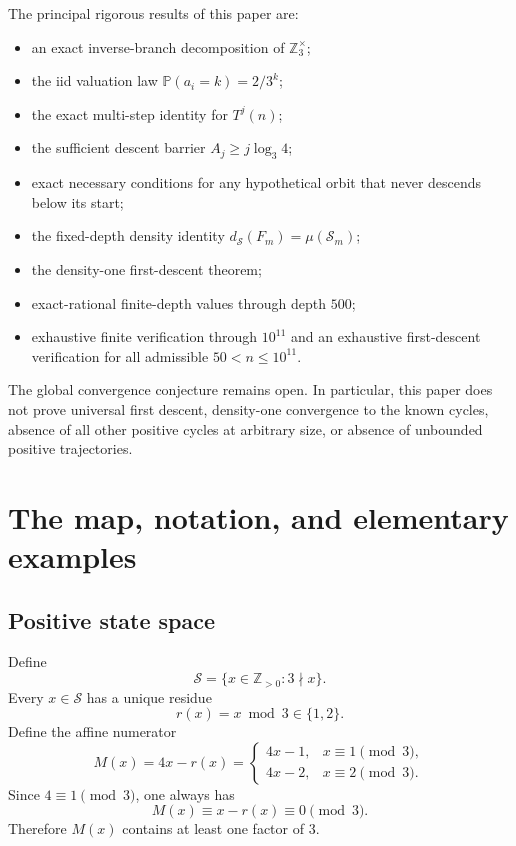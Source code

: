 \documentclass[11pt]{article}
\theoremstyle{definition}
\theoremstyle{remark}
\newcommand{\Sset}{\mathcal S}
\newcommand{\Z}{\mathbb Z}
\newcommand{\Zthree}{\mathbb Z_3}
\newcommand{\Prob}{\mathbb P}
\newcommand{\ds}{d_{\Sset}}
\begin{document}
The principal rigorous results of this paper are:
\begin{itemize}[leftmargin=2.2em]
\item an exact inverse-branch decomposition of $\Zthree^\times$;
\item the iid valuation law $\Prob(a_i=k)=2/3^k$;
\item the exact multi-step identity for $T^j(n)$;
\item the sufficient descent barrier $A_j\ge j\log_3 4$;
\item exact necessary conditions for any hypothetical orbit that never descends below its start;
\item the fixed-depth density identity $\ds(F_m)=\mu(\mathcal S_m)$;
\item the density-one first-descent theorem;
\item exact-rational finite-depth values through depth $500$;
\item exhaustive finite verification through $10^{11}$ and an exhaustive first-descent verification for all admissible $50<n\le10^{11}$.
\end{itemize}

The global convergence conjecture remains open.  In particular, this paper does not prove universal first descent, density-one convergence to the known cycles, absence of all other positive cycles at arbitrary size, or absence of unbounded positive trajectories.

\section{The map, notation, and elementary examples}

\subsection{Positive state space}

Define
\begin{equation}
\Sset=\{x\in\Z_{>0}:3\nmid x\}.
\label{eq:S}
\end{equation}
Every $x\in\Sset$ has a unique residue
\begin{equation}
r(x)=x\bmod3\in\{1,2\}.
\label{eq:r}
\end{equation}
Define the affine numerator
\begin{equation}
M(x)=4x-r(x)
=
\begin{cases}
4x-1,&x\equiv1\pmod3,\\
4x-2,&x\equiv2\pmod3.
\end{cases}
\label{eq:M}
\end{equation}
Since $4\equiv1\pmod3$, one always has
\[
M(x)\equiv x-r(x)\equiv0\pmod3.
\]
Therefore $M(x)$ contains at least one factor of $3$.
\end{document}
